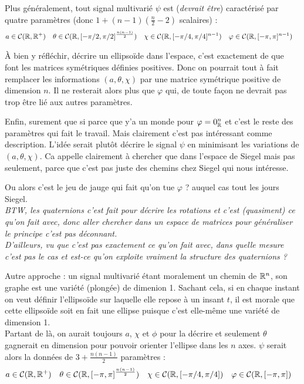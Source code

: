 \begin{proposition}\label{prop:gene_param_signal_v1}
Plus généralement, tout signal multivarié $\psi$ est (\textit{devrait être}) caractérisé par quatre paramètres (donc $1+(n-1)(\frac{n}{2}-2)$ scalaires) :
\begin{align*}
	a&\in\mathcal{C}(\mathbb{R},\mathbb{R}^+)  &  \theta&\in\mathcal{C}(\mathbb{R}, [-\pi/2,\pi/2]^{\frac{n(n-1)}{2}})  &  \chi&\in\mathcal{C}(\mathbb{R}, [-\pi/4,\pi/4]^{n-1})  &  \varphi&\in\mathcal{C}(\mathbb{R}, [-\pi,\pi]^{n-1})
\end{align*}	
\end{proposition}

\`A bien y réfléchir, décrire un ellipsoïde dans l'espace, c'est exactement de que font les matrices symétriques définies positives. Donc on pourrait tout à fait remplacer les informations $(a,\theta,\chi)$ par une matrice symétrique positive de dimension $n$. Il ne resterait alors plus que $\varphi$ qui, de toute façon ne devrait pas trop être lié aux autres paramètres.

Enfin, surement que si parce que y'a un monde pour $\varphi=0_{\mathbb{R}}^n$ et c'est le reste des paramètres qui fait le travail. Mais clairement c'est pas intéressant comme description. L'idée serait plutôt décrire le signal $\psi$ en minimisant les variations de $(a,\theta,\chi)$.
Ca appelle clairement à chercher que dans l'espace de Siegel mais pas seulement, parce que c'est pas juste des chemins chez Siegel qui nous intéresse.

Ou alors c'est le jeu de jauge qui fait qu'on tue $\varphi$ ? auquel cas tout les jours Siegel.
\\

\textit{BTW, les quaternions c'est fait pour décrire les rotations et c'est (quasiment) ce qu'on fait avec, donc aller chercher dans un espace de matrices pour généraliser le principe c'est pas déconnant.}
\\
\textit{D'ailleurs, vu que c'est pas exactement ce qu'on fait avec, dans quelle mesure c'est pas le cas et est-ce qu'on exploite vraiment la structure des quaternions ?}
\\ 

\begin{proposition}\label{prop:gene_param_signal_v2}
Autre approche : un signal multivarié étant moralement un chemin de $\mathbb{R}^n$, son graphe est une variété (plongée) de dimenion 1. Sachant cela, si en chaque instant on veut définir l'ellipsoïde sur laquelle elle repose à un insant $t$, il est morale que cette ellipsoïde soit en fait une ellipse puisque c'est elle-même une variété de dimension 1.
\\
Partant de là, on aurait toujours $a$, $\chi$ et $\phi$ pour la décrire et seulement $\theta$ gagnerait en dimension pour pouvoir orienter l'ellipse dans les $n$ axes. $\psi$ serait alors la données de $3+\frac{n(n-1)}{2}$ paramètres :
\begin{align*}
	a&\in\mathcal{C}(\mathbb{R},\mathbb{R}^+)  &  \theta&\in\mathcal{C}(\mathbb{R}, [-\pi,\pi]^{\frac{n(n-1)}{2}})  &  \chi&\in\mathcal{C}(\mathbb{R}, [-\pi/4,\pi/4])  &  \varphi&\in\mathcal{C}(\mathbb{R}, [-\pi,\pi])
\end{align*}
\end{proposition}

